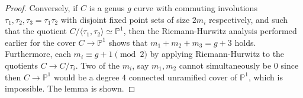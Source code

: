 \documentclass[10pt,a4paper]{amsart}
\renewcommand{\P}{\mathbb{P}}
\begin{document}
\begin{proof}
 Conversely, if $C$ is a genus $g$ curve with commuting involutions $\tau_1, \tau_2,
 \tau_3 = \tau_1 \tau_2$ with disjoint fixed point sets of size $2m_{i}$
 respectively, and such that the quotient $C/\langle \tau_1, \tau_2 \rangle
 \simeq \P^{1}$, then the Riemann-Hurwitz analysis performed earlier for the
 cover $C \to \P^{1}$ shows that
 $m_1 + m_2 + m_3 = g+3$ holds. Furthermore, each $m_{i} \equiv g+1 \pmod 2$ by
 applying Riemann-Hurwitz to the quotients $C \to C /\tau_i$. Two of the $m_i$, say $m_1, m_2$ cannot simultaneously be $0$ since then $C \to
 \P^{1}$ would be a degree $4$ connected unramified
 cover of $\P^{1}$, which is impossible. The lemma is shown. 
\end{proof}
\end{document}
